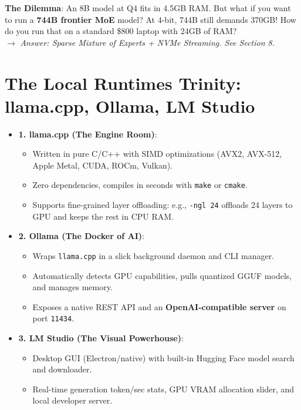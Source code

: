 \documentclass[11pt,a4paper]{article}
\begin{document}
\begin{colibribox}
    \small
    \textbf{The Dilemma}: An 8B model at Q4 fits in 4.5GB RAM. But what if you want to run a \textbf{744B frontier MoE} model? At 4-bit, 744B still demands 370GB! How do you run that on a standard \$800 laptop with 24GB of RAM? \\
    $\rightarrow$ \textit{Answer: Sparse Mixture of Experts + NVMe Streaming. See Section 8.}
\end{colibribox}

\section{The Local Runtimes Trinity: llama.cpp, Ollama, LM Studio}
\begin{itemize}
    \item \textbf{1. llama.cpp (The Engine Room)}:
    \begin{itemize}
        \item Written in pure C/C++ with SIMD optimizations (AVX2, AVX-512, Apple Metal, CUDA, ROCm, Vulkan).
        \item Zero dependencies, compiles in seconds with \texttt{make} or \texttt{cmake}.
        \item Supports fine-grained layer offloading: e.g., \texttt{-ngl 24} offloads 24 layers to GPU and keeps the rest in CPU RAM.
    \end{itemize}
    \item \textbf{2. Ollama (The Docker of AI)}:
    \begin{itemize}
        \item Wraps \texttt{llama.cpp} in a slick background daemon and CLI manager.
        \item Automatically detects GPU capabilities, pulls quantized GGUF models, and manages memory.
        \item Exposes a native REST API and an \textbf{OpenAI-compatible server} on port \texttt{11434}.
    \end{itemize}
    \item \textbf{3. LM Studio (The Visual Powerhouse)}:
    \begin{itemize}
        \item Desktop GUI (Electron/native) with built-in Hugging Face model search and downloader.
        \item Real-time generation token/sec stats, GPU VRAM allocation slider, and local developer server.
    \end{itemize}
\end{itemize}
\end{document}
